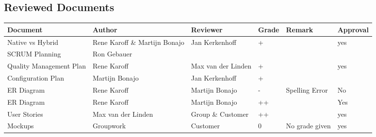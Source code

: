\begin{landscape}
	\section*{Reviewed Documents}
	\pagestyle{plain}
	\begin{longtable}[htbp]{ l l l l l l}
		\textbf{Document} & \textbf{Author} & \textbf{Reviewer} & \textbf{Grade} & \textbf{Remark} & \textbf{Approval}\\ \hline
		Native vs Hybrid & Rene Karoff \& Martijn Bonajo & Jan Kerkenhoff &+& & yes\\
		SCRUM Planning & Ron Gebauer & & & & \\
		Quality Management Plan & Rene Karoff & Max van der Linden &+& & yes \\
		Configuration Plan & Martijn Bonajo & Jan Kerkenhoff &+&  & \\
		ER Diagram & Rene Karoff & Martijn Bonajo & - & Spelling Error& No\\
		ER Diagram & Rene Karoff & Martijn Bonajo &++&& Yes\\
		User Stories & Max van der Linden & Group \& Customer & ++ & & yes \\
		Mockups & Groupwork & Customer & 0 & No grade given &  yes\\
	\end{longtable}
\end{landscape}
